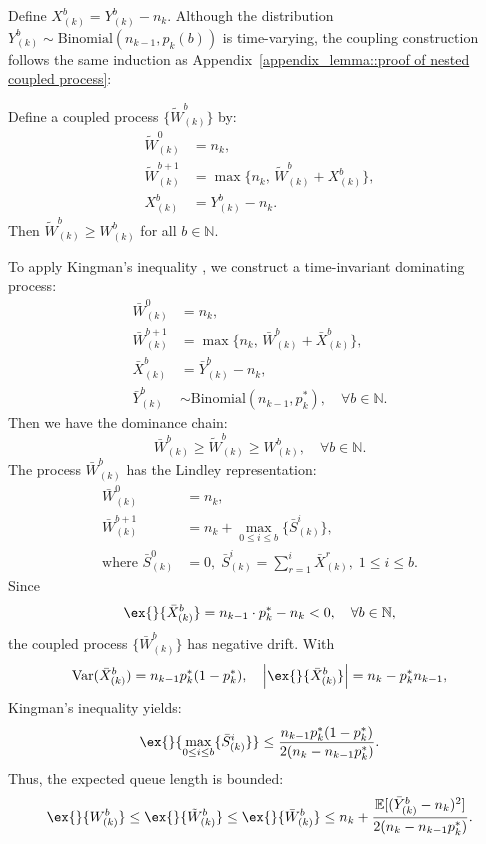 Define $X_{(k)}^b = Y_{(k)}^b - n_k$. Although the distribution $Y_{(k)}^b\sim \text{Binomial}(n_{k-1},p_k(b))$ is time-varying, the coupling construction follows the same induction as Appendix~\ref{appendix_lemma::proof of nested coupled process}:
\begin{lemma}\label{lemma: coupling, time varying}
Define a coupled process $\{ \tilde{W}_{(k)}^b\}$ by:
\begin{equation*}
\begin{aligned}
\tilde{W}_{(k)}^0 &= n_k, \\
\tilde{W}_{(k)}^{b+1} &= \max\{ n_k, \, \tilde{W}_{(k)}^b+X_{(k)}^b\}, \\
X_{(k)}^b &= Y_{(k)}^b - n_k.
\end{aligned}
\end{equation*}
Then $\tilde{W}^b_{(k)}\geq W^b_{(k)}$ for all $b\in \mathbb{N}$.
\end{lemma}
To apply Kingman's inequality \citep{kingman1962queues}, we construct a time-invariant dominating process:
\begin{equation*}
\begin{aligned}
\bar{W}_{(k)}^0 &= n_k, \\
\bar{W}_{(k)}^{b+1} &= \max\{ n_k,\, \bar{W}_{(k)}^{b}+\bar{X}_{(k)}^b \}, \\
\bar{X}_{(k)}^b &= \bar{Y}_{(k)}^b  -n_k, \\
\bar{Y}_{(k)}^b &\sim \text{Binomial}(n_{k-1}, p_k^*), \quad \forall b\in \mathbb{N}.
\end{aligned}
\end{equation*}
Then we have the dominance chain:
$$\bar{W}^b_{(k)}\geq \tilde{W}^b_{(k)}\geq W^b_{(k)},\quad \forall b\in \mathbb{N}.$$
The process $\bar{W}^b_{(k)}$ has the Lindley representation:
\begin{equation*}
\begin{aligned}
\bar{W}_{(k)}^0 &= n_k, \\
\bar{W}_{(k)}^{b+1} &= n_k + \max_{0\leq i\leq b}\{ \bar{S}_{(k)}^i \}, \\
\text{where } \bar{S}_{(k)}^0 &= 0,\; \bar{S}_{(k)}^i = \sum_{r=1}^i \bar{X}_{(k)}^{r},\; 1\leq i\leq b.
\end{aligned}
\end{equation*}
Since
$$ \ex{}{\bar{X}_{(k)}^b} = n_{k-1}\cdot p_{k}^* - n_k <0,\quad \forall b\in \mathbb{N}, $$
the coupled process $\{\bar{W}_{(k)}^b \}$ has negative drift. With
$$\text{Var}(\bar{X}_{(k)}^b) = n_{k-1}p_k^*(1-p_k^*),\quad \left|\ex{}{\bar{X}_{(k)}^b}\right|=n_k - p_k^* n_{k-1},$$
Kingman's inequality \citep{kingman1962queues} yields:
$$\ex{}{\max_{0\leq i\leq b}\{ \bar{S}_{(k)}^i \}  }\leq  \frac{  n_{k-1}p_k^*(1-p_k^*) }{ 2(n_k - n_{k-1}p_k^*)}. $$
Thus, the expected queue length is bounded:
$$\ex{}{W_{(k)}^b}\leq \ex{}{\tilde{W}_{(k)}^b}\leq \ex{}{\bar{W}_{(k)}^b} \leq n_k + \frac{\mathbb{E}[(\bar{Y}_{(k)}^b-n_k)^2]}{2(n_k - n_{k-1}p_k^*)}.$$
